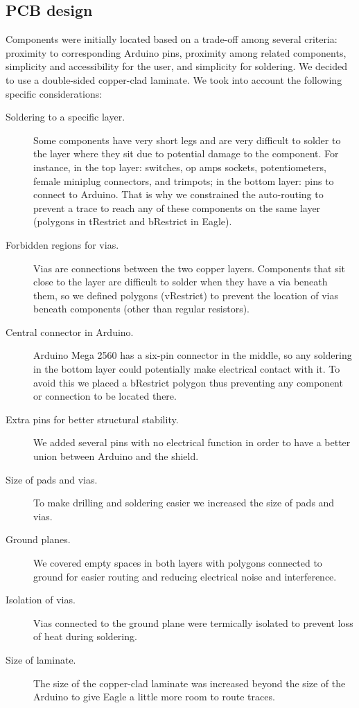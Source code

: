 \documentclass[twocolumn]{article}
\begin{document}
\subsection{PCB design}

Components were initially located based on a trade-off among several criteria: proximity to corresponding Arduino pins, proximity among related components, simplicity and accessibility for the user, and simplicity for soldering. We decided to use a double-sided copper-clad laminate. We took into account the following specific considerations:

\begin{description}
    \item[Soldering to a specific layer.] Some components have very short legs and are very difficult to solder to the layer where they sit due to potential damage to the component. For instance, in the top layer: switches, op amps sockets, potentiometers, female miniplug connectors, and trimpots; in the bottom layer: pins to connect to Arduino. That is why we constrained the auto-routing to prevent a trace to reach any of these components on the same layer (polygons in tRestrict and bRestrict in Eagle).
    
    \item[Forbidden regions for vias.] Vias are connections between the two copper layers. Components that sit close to the layer are difficult to solder when they have a via beneath them, so we defined polygons (vRestrict) to prevent the location of vias beneath components (other than regular resistors).
    
    \item[Central connector in Arduino.] Arduino Mega 2560 has a six-pin connector in the middle, so any soldering in the bottom layer could potentially make electrical contact with it. To avoid this we placed a bRestrict polygon thus preventing any component or connection to be located there.
    
    \item[Extra pins for better structural stability.] We added several pins with no electrical function in order to have a better union between Arduino and the shield.
    
    \item[Size of pads and vias.] To make drilling and soldering easier we increased the size of pads and vias.
    
    \item[Ground planes.] We covered empty spaces in both layers with polygons connected to ground for easier routing and reducing electrical noise and interference.
    
    \item[Isolation of vias.] Vias connected to the ground plane were termically isolated to prevent loss of heat during soldering.
    
    \item[Size of laminate.] The size of the copper-clad laminate was increased beyond the size of the Arduino to give Eagle a little more room to route traces.
\end{description}
\end{document}
